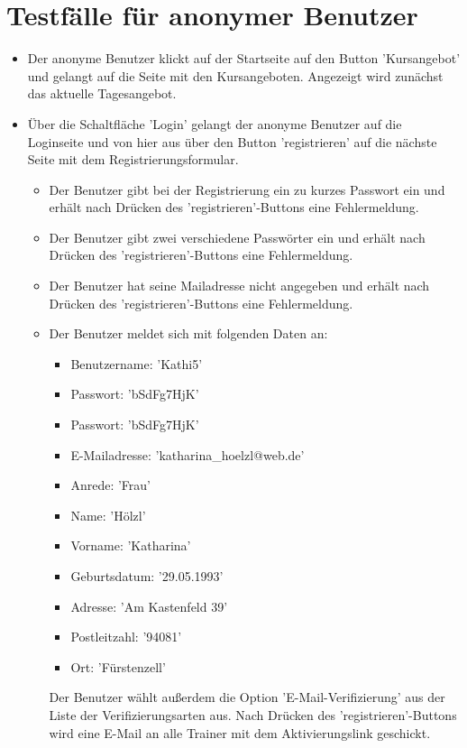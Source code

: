 \documentclass[a4paper]{scrreprt}
\newcounter{Lc}
\newcounter{Hc}
\newcommand{\stepHc}{\stepcounter{Hc}\setcounter{Lc}{0}}
\begin{document}
			
	\section{Testfälle für anonymer Benutzer}
			\stepHc
			\begin{itemize}
				\item {} 
				Der anonyme Benutzer klickt auf der Startseite auf den Button 'Kursangebot'	und gelangt auf die Seite mit den Kursangeboten. Angezeigt wird zunächst das aktuelle Tagesangebot.	
				\item {} 
				Über die Schaltfläche 'Login' gelangt der anonyme Benutzer auf die Loginseite und von hier aus über den Button 'registrieren' auf die nächste Seite mit dem Registrierungsformular. 		
				\begin{itemize}
					\item Der Benutzer gibt bei der Registrierung ein zu kurzes Passwort ein und erhält nach Drücken des 'registrieren'-Buttons eine Fehlermeldung.	
					\item Der Benutzer gibt zwei verschiedene Passwörter ein und erhält nach Drücken des 'registrieren'-Buttons eine Fehlermeldung.
					\item Der Benutzer hat seine Mailadresse nicht angegeben und erhält nach Drücken des 'registrieren'-Buttons eine Fehlermeldung.	
					\item Der Benutzer meldet sich mit folgenden Daten an: 
						\begin{itemize}
							\item Benutzername: 'Kathi5'
							\item Passwort: 'bSdFg7HjK'
							\item Passwort: 'bSdFg7HjK'
							\item E-Mailadresse: 'katharina\_hoelzl@web.de'
							\item Anrede: 'Frau'
							\item Name: 'Hölzl'
							\item Vorname: 'Katharina'
							\item Geburtsdatum: '29.05.1993'
							\item Adresse: 'Am Kastenfeld 39'
							\item Postleitzahl: '94081'
							\item Ort: 'Fürstenzell'
						\end{itemize}
					Der Benutzer wählt außerdem die Option 'E-Mail-Verifizierung' aus der Liste der Verifizierungsarten aus. Nach Drücken des 'registrieren'-Buttons wird eine E-Mail an alle Trainer mit dem Aktivierungslink geschickt.
				\end{itemize}
			\end{itemize}	
		
\end{document}
